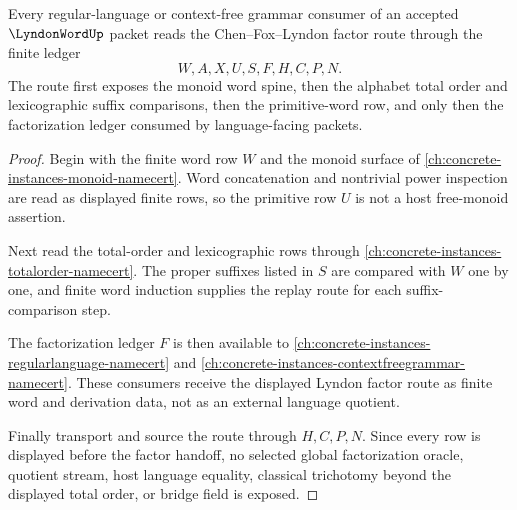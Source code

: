 \begin{theorem}
\label{thm:lyndon-word-chen-fox-lyndon-factor-route}
Every regular-language or context-free grammar consumer of an accepted $\LyndonWordUp$ packet reads the Chen--Fox--Lyndon factor route through the finite ledger
$$
W,A,X,U,S,F,H,C,P,N .
$$
The route first exposes the monoid word spine, then the alphabet total order and lexicographic suffix comparisons, then the primitive-word row, and only then the factorization ledger consumed by language-facing packets.
\end{theorem}
\begin{proof}
Begin with the finite word row $W$ and the monoid surface of \autoref{ch:concrete-instances-monoid-namecert}. Word concatenation and nontrivial power inspection are read as displayed finite rows, so the primitive row $U$ is not a host free-monoid assertion.

Next read the total-order and lexicographic rows through \autoref{ch:concrete-instances-totalorder-namecert}. The proper suffixes listed in $S$ are compared with $W$ one by one, and finite word induction supplies the replay route for each suffix-comparison step.

The factorization ledger $F$ is then available to \autoref{ch:concrete-instances-regularlanguage-namecert} and \autoref{ch:concrete-instances-contextfreegrammar-namecert}. These consumers receive the displayed Lyndon factor route as finite word and derivation data, not as an external language quotient.

Finally transport and source the route through $H,C,P,N$. Since every row is displayed before the factor handoff, no selected global factorization oracle, quotient stream, host language equality, classical trichotomy beyond the displayed total order, or bridge field is exposed.
\end{proof}




